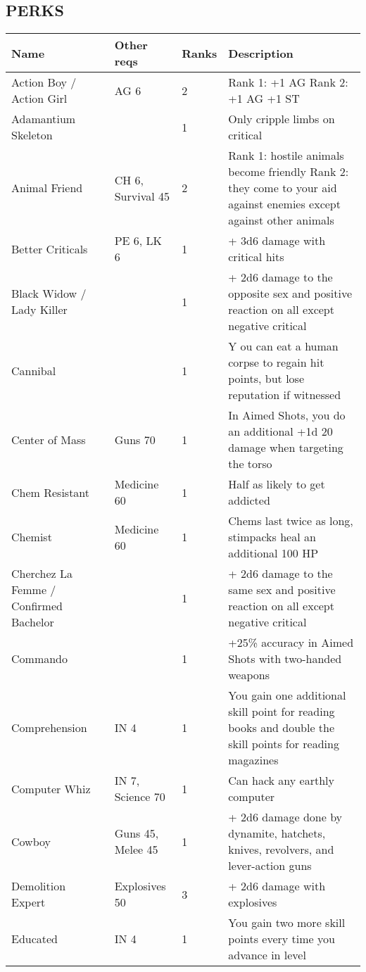 
\subsection{PERKS}
\begin{longtable}{|p{3.3cm}|p{3.1cm}|p{1.2cm}|p{8.4cm}|}
\hline
\bfseries Name & \bfseries Other reqs & \bfseries Ranks & \bfseries Description \\
\hline
\endhead

Action Boy / Action Girl & AG 6 & 2 & Rank 1: +1 AG Rank 2: +1 AG +1 ST \\
Adamantium Skeleton & & 1 & Only cripple limbs on critical \\
Animal Friend & CH 6, Survival 45 & 2 & Rank 1: hostile animals become friendly Rank 2: they come to your aid against enemies except against other animals \\
Better Criticals & PE 6, LK 6 & 1 & + 3d6 damage with critical hits \\
Black Widow / Lady Killer & & 1 & + 2d6 damage to the opposite sex and positive reaction on all except negative critical \\
Cannibal & & 1 & Y ou can eat a human corpse to regain hit points, but lose reputation if witnessed \\
Center of Mass & Guns 70 & 1 & In Aimed Shots, you do an additional +1d 20 damage when targeting the torso \\
Chem Resistant & Medicine 60 & 1 & Half as likely to get addicted \\
Chemist & Medicine 60 & 1 & Chems last twice as long, stimpacks heal an additional 100 HP \\
Cherchez La Femme / Confirmed Bachelor & & 1 & + 2d6 damage to the same sex and positive reaction on all except negative critical \\
Commando & & 1 & +25\% accuracy in Aimed Shots with two-handed weapons \\
Comprehension & IN 4 & 1 & You gain one additional skill point for reading books and double the skill points for reading magazines \\
Computer Whiz & IN 7, Science 70 & 1 & Can hack any earthly computer \\
Cowboy & Guns 45, Melee 45 & 1 & + 2d6 damage done by dynamite, hatchets, knives, revolvers, and lever-action guns \\
Demolition Expert & Explosives 50 & 3 & + 2d6 damage with explosives \\
Educated & IN 4 & 1 & You gain two more skill points every time you advance in level \\

\end{longtable}

